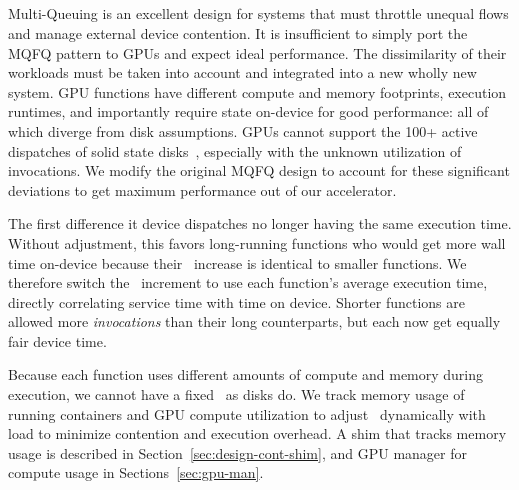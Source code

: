 \subsection{\QNameFull}
\label{sec:mq}

Multi-Queuing is an excellent design for systems that must throttle unequal flows and manage external device contention.
It is insufficient to simply port the MQFQ pattern to GPUs and expect ideal performance.
The dissimilarity of their workloads must be taken into account and integrated into a new wholly new system.
GPU functions have different compute and memory footprints, execution runtimes, and importantly require state on-device for good performance: all of which diverge from disk assumptions.
GPUs cannot support the 100+ active dispatches of solid state disks~\cite{hedayati2019multi}, especially with the unknown utilization of invocations.
We modify the original MQFQ design to account for these significant deviations to get maximum performance out of our accelerator.


The first difference it device dispatches no longer having the same execution time.
Without adjustment, this favors long-running functions who would get more wall time on-device because their \VT~increase is identical to smaller functions.
We therefore switch the \VT~increment to use each function's average execution time, directly correlating service time with time on device. 
Shorter functions are allowed more \emph{invocations} than their long counterparts, but each now get equally fair device time.

Because each function uses different amounts of compute and memory during execution, we cannot have a fixed \D~as disks do.
We track memory usage of running containers and GPU compute utilization to adjust \D~dynamically with load to minimize contention and execution overhead.
A shim that tracks memory usage is described in Section~\ref{sec:design-cont-shim}, and GPU manager for compute usage in Sections~\ref{sec:gpu-man}.


